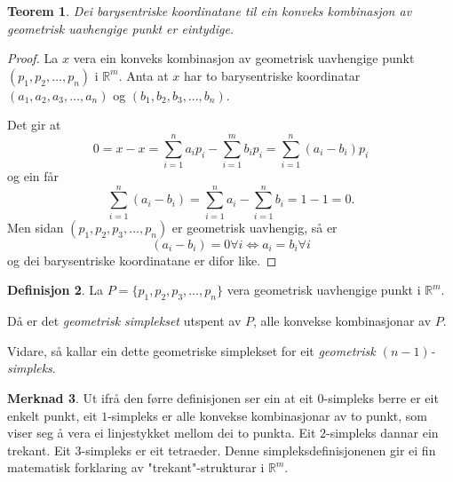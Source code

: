 \documentclass[a4paper, 12pt, norsk]{article}
\theoremstyle{plain}
\newtheorem{theorem}{Teorem}[section]
\theoremstyle{definition}
\newtheorem{definition}[theorem]{Definisjon}
\newtheorem{remark}[theorem]{Merknad}
\newcommand{\Rb}{\mathbb{R}}
\newcommand{\tuple}[1]{ \left( #1 \right) } %
\begin{document}
\begin{theorem} \label{thm:unik-barysentrisk-koordinat}
	Dei barysentriske koordinatane til ein konveks kombinasjon av geometrisk uavhengige punkt er eintydige.
\end{theorem}

\begin{proof}
	La $x$ vera ein konveks kombinasjon av geometrisk uavhengige punkt \( \tuple{p_1, p_2, \dots, p_n} \) i $\Rb^m$. Anta at $x$ har to barysentriske koordinatar $(a_1, a_2, a_3, \dots, a_n)$ og $(b_1, b_2, b_3, \dots, b_n)$. 
	
	Det gir at
	\begin{equation*}
		0 = x - x = \sum_{i=1}^n a_ip_i - \sum_{i=1}^m b_ip_i=\sum_{i=1}^n (a_i-b_i)p_i
	\end{equation*}
	og ein får
	\begin{equation*}
		\sum_{i=1}^n(a_i-b_i)=\sum_{i=1}^na_i - \sum_{i=1}^nb_i = 1 - 1 = 0.
	\end{equation*}
	Men sidan $(p_1, p_2, p_3, \dots, p_n)$ er geometrisk uavhengig, så er
	\begin{equation*}
		(a_i-b_i)=0\forall i \Longleftrightarrow a_i = b_i \forall i
	\end{equation*}
	og dei barysentriske koordinatane er difor like.
\end{proof}

\begin{definition}
	La $P=\{p_1, p_2, p_3, \dots, p_n\}$ vera geometrisk uavhengige punkt i $\Rb^m$.

	Då er det \emph{geometrisk simplekset} utspent av \( P \), alle konvekse kombinasjonar av $P$.
	
	Vidare, så kallar ein dette geometriske simplekset for eit \emph{geometrisk $(n-1)$-simpleks}.
\end{definition}

\begin{remark}
	Ut ifrå den førre definisjonen ser ein at eit $0$-simpleks berre er eit enkelt punkt, eit $1$-simpleks er alle konvekse kombinasjonar av to punkt, som viser seg å vera ei linjestykket mellom dei to punkta. Eit $2$-simpleks dannar ein trekant. Eit $3$-simpleks er eit tetraeder. Denne simpleksdefinisjonenen gir ei fin matematisk forklaring av "trekant"-strukturar i $\Rb^m$.
\end{remark}
\end{document}
